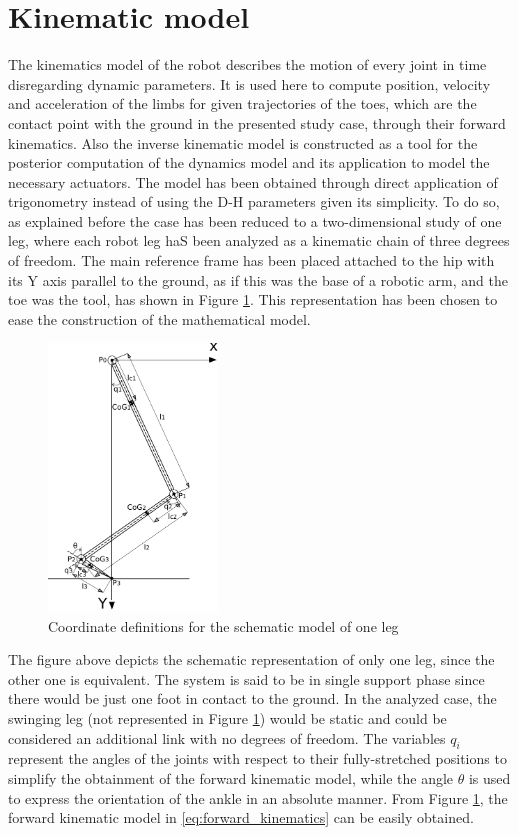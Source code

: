 
\section{Kinematic model}
\label{sec_kinematic_model}
The kinematics model of the robot describes the motion of every joint in time disregarding dynamic parameters.
It is used here to compute position, velocity and acceleration of the limbs for given trajectories of the toes, which are the contact point with the ground in the presented study case, through their forward kinematics.
Also the inverse kinematic model is constructed as a tool for the posterior computation of the dynamics model and its application to model the necessary actuators.
The model has been obtained through direct application of trigonometry instead of using the D-H parameters given its simplicity.
To do so, as explained before the case has been reduced to a two-dimensional study of one leg, where each robot leg haS been analyzed as a kinematic chain of three degrees of freedom.
The main reference frame has been placed attached to the hip with its Y axis parallel to the ground, as if this was the base of a robotic arm, and the toe was the tool, has shown in Figure \ref{fig:kinematics}.
This representation has been chosen to ease the construction of the mathematical model.

\begin{figure}[h]
	\centering
	\includegraphics[width=0.4\textwidth]{figures/kinematics_model.pdf}
	\caption{Coordinate definitions for the schematic model of one leg}
	\label{fig:kinematics}
\end{figure}

The figure above depicts the schematic representation of only one leg, since the other one is equivalent. 
The system is said to be in single support phase since there would be just one foot in contact to the ground.
In the analyzed case, the swinging leg (not represented in Figure \ref{fig:kinematics}) would be static and could be considered an additional link with no degrees of freedom.
The variables $q_{i}$ represent the angles of the joints with respect to their fully-stretched positions to simplify the obtainment of the forward kinematic model, while the angle $\theta$ is used to express the orientation of the ankle in an absolute manner. 
From Figure \ref{fig:kinematics}, the forward kinematic model in \ref{eq:forward_kinematics} can be easily obtained.


